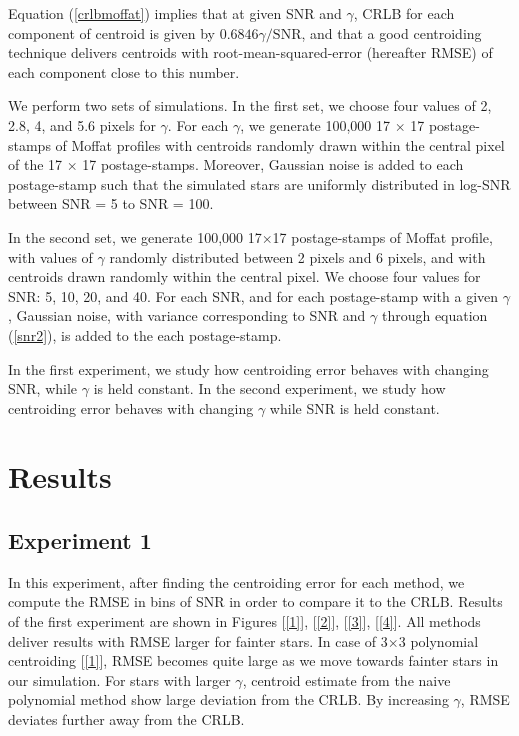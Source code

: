 \documentclass[12pt, preprint]{aastex}
\begin{document}
Equation (\ref{crlbmoffat}) implies that at given SNR and $\gamma$,
CRLB for each component of centroid is given by $0.6846\gamma/\text{SNR}$,
and that a good centroiding technique delivers centroids with
root-mean-squared-error (hereafter RMSE) of each component close to
this number. 

We perform two sets of simulations. In the first set, we choose four values of
2, 2.8, 4, and 5.6 pixels for $\gamma$. For each $\gamma$, we generate 100,000 
17 $\times$ 17 postage-stamps of Moffat profiles with centroids randomly drawn
within the central pixel of the 17 $\times$ 17 postage-stamps. Moreover, Gaussian
noise is added to each postage-stamp such that the simulated stars are uniformly
 distributed in log-SNR between SNR = 5 to SNR = 100.

In the second set, we generate 100,000 17$\times$17 postage-stamps
of Moffat profile, with values of $\gamma$ randomly distributed 
between 2 pixels and 6 pixels, and with centroids drawn randomly within 
the central pixel. We choose four values for SNR: 5, 10, 20, and 40. 
For each SNR, and for each postage-stamp with a given $\gamma$, 
Gaussian noise, with variance corresponding to SNR and $\gamma$ through equation 
(\ref{snr2}), is added to the each postage-stamp.

In the first experiment, we study how centroiding error behaves with changing
SNR, while $\gamma$ is held constant. In the second experiment, we study 
how centroiding error behaves with changing $\gamma$ while SNR is held constant.


\section{Results}\label{sec:results}

\subsection{Experiment 1}
   
In this experiment, after finding the centroiding error for each method,
we compute the RMSE in bins of SNR in order to compare it to the CRLB. 
Results of the first experiment are shown in Figures [\ref{1}], [\ref{2}],
[\ref{3}], [\ref{4}]. All methods deliver results
with RMSE larger for fainter stars.
In case of 3$\times$3 polynomial centroiding [\ref{1}], RMSE becomes
quite large as we move towards fainter stars in our simulation.
For stars with larger $\gamma$, centroid estimate from the naive polynomial
method show large deviation from the CRLB. By increasing $\gamma$,
RMSE deviates further away from the CRLB.
\end{document}
